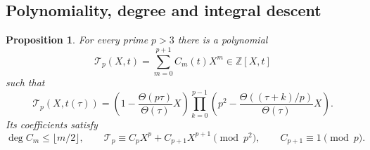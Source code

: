 \documentclass[11pt,a4paper]{article}
\newtheorem{proposition}[theorem]{Proposition}
\theoremstyle{remark}
\newcommand{\Z}{\mathbb Z}\newcommand{\Q}{\mathbb Q}
\newcommand{\Tp}{\mathcal T_p}
\begin{document}
\subsection{Polynomiality, degree and integral descent}
\begin{proposition}\label{prop:Hecke}
For every prime $p>3$ there is a polynomial
\[
 \Tp(X,t)=\sum_{m=0}^{p+1}C_m(t)X^m\in\Z[X,t]
\]
such that
\begin{equation}\label{eq:Hecke-product}
 \Tp(X,t(\tau))=
 \left(1-\frac{\Theta(p\tau)}{\Theta(\tau)}X\right)
 \prod_{k=0}^{p-1}
 \left(p^2-\frac{\Theta((\tau+k)/p)}{\Theta(\tau)}X\right).
\end{equation}
Its coefficients satisfy
\begin{equation}\label{eq:Hecke-properties}
 \deg C_m\le\lfloor m/2\rfloor,\qquad
 \Tp\equiv C_pX^p+C_{p+1}X^{p+1}\pmod{p^2},\qquad
 C_{p+1}\equiv1\pmod p.
\end{equation}
\end{proposition}
\end{document}
